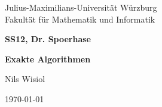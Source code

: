 \begin{titlepage}
  Julius-Maximilians-Universität Würzburg\\
  Fakultät für Mathematik und Informatik
  
  \vspace{3cm}
  
  \begin{center}
   \LARGE\textbf{SS12, Dr. Spoerhase}
  \end{center}
  
  \vspace{0cm}
  
  \begin{center}
   \huge\textbf{Exakte Algorithmen}
  \end{center}
  
  \vspace{1cm}
  
  \begin{center}
   \Large Nils Wisiol
  \end{center}
  
  \vspace{0cm}
  
  \begin{center}
   \Large \today
  \end{center}
  
  
\end{titlepage}

